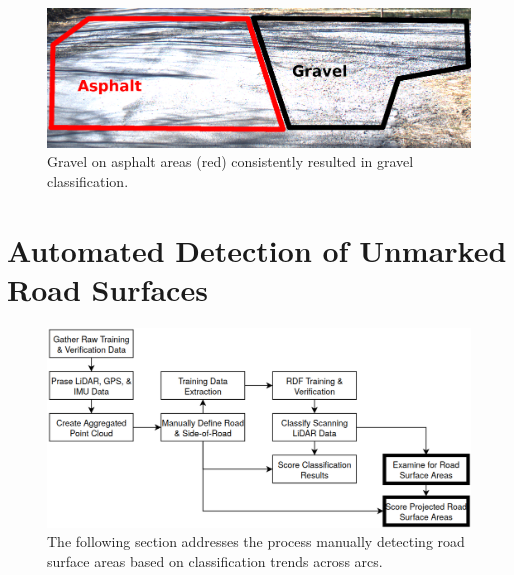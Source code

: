 \documentclass[numbered,pdftex]{ohio-etd}
\begin{document}
{{		
%		
%
%		
	
		\begin{figure}[H]
			\centering
			\includegraphics[width=0.95\linewidth]{Defense_Images/gravel_on_asphalt}
			\caption[Gravel on Asphalt]{Gravel on asphalt areas (red) consistently resulted in gravel classification.}
			\label{fig:gravel_on_asphalt}
		\end{figure}
		
	
	}
	
	\section{Automated Detection of Unmarked Road Surfaces}\label{sec:auto_det}{
		
		\begin{figure}[H]
			\centering
			\includegraphics[width=0.95\linewidth]{Defense_Images/flowz_examine_road_and_score}
			\caption[Automatic Road Prediction Flowchart Context]{The following section addresses the process manually detecting road surface areas based on classification trends across arcs.}
			\label{fig:flowz_examine_road_and_score_2}
		\end{figure}
		
}}
\end{document}
